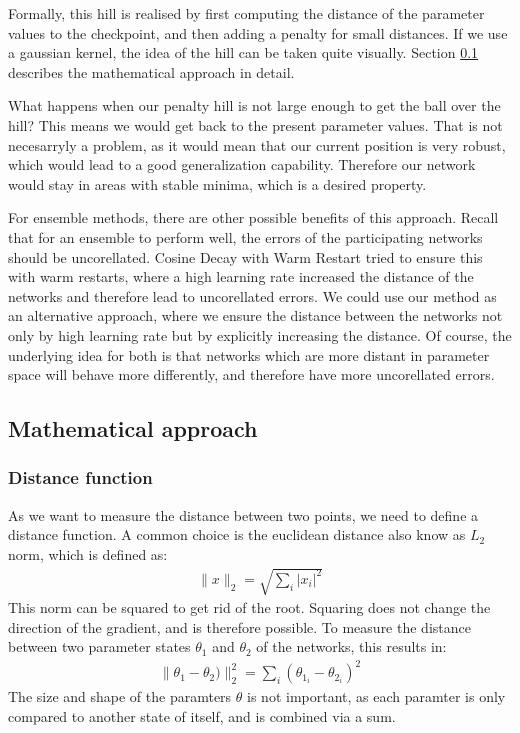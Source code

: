 Formally, this hill is realised by first computing the distance of the parameter
values to the checkpoint, and then adding a penalty for small distances. If we
use a gaussian kernel, the idea of the hill can be taken quite visually.
Section \ref{sub:Mathematical_approach} describes the mathematical approach in
detail.

What happens when our penalty hill is not large enough to get the ball over the
hill? This means we would get back to the present parameter values. That is not
necesarryly a problem, as it would mean that our current position is very
robust, which would lead to a good generalization capability. Therefore our
network would stay in areas with stable minima, which is a desired property.

For ensemble methods, there are other possible benefits of this approach. Recall
that for an ensemble to perform well, the errors of the participating networks
should be uncorellated. Cosine Decay with Warm Restart \cite{loshchilov2016sgdr}
tried to ensure this with warm restarts, where a high learning rate increased the
distance of the networks and therefore lead to uncorellated errors. We could
use our method as an alternative approach, where we ensure the distance between
the networks not only by high learning rate but by explicitly increasing the
distance. Of course, the underlying idea for both is that networks which are
more distant in parameter space will behave more differently, and therefore have
more uncorellated errors.



\subsection{Mathematical approach}\label{sub:Mathematical_approach}
\subsubsection{Distance function}\label{distance_function}
As we want to measure the distance between two points, we need to define a
distance function. A common choice is the euclidean distance also know as $L_2$
norm, which is defined as: 
\begin{align}
    \rVert x \lVert_2 = \sqrt{\sum_i \lvert x_i \rvert^2}
\end{align}
This norm can  be squared to get rid of the root. Squaring does not change
the direction of the gradient, and is therefore possible. To measure the
distance between two parameter states $\theta_1$ and $\theta_2$ of the networks,
this results in:
\begin{align}\label{eq:distance}
    \rVert\theta_1 - \theta_2)\lVert_2^2= \sum_i (\theta_{1_i}-\theta_{2_i})^2
\end{align}
The size and shape of the paramters $\theta$ is not important, as each paramter
is only compared to another state of itself, and is combined via a sum.

